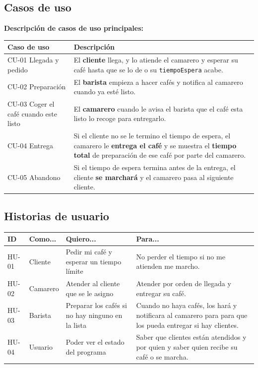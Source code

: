 \documentclass[a4paper,12pt]{report}
\begin{document}
\subsection{Casos de uso}
\noindent \textbf{Descripción de casos de uso principales:}
\begin{table}[H]
  \centering
  \begin{tabularx}{\linewidth}{|l|Y|}
    \hline
    \textbf{Caso de uso} & \textbf{Descripción} \\
    \hline
    CU-01 Llegada y pedido & El \textbf{cliente} llega, y lo atiende el camarero y esperar su café hasta que se lo de o su \texttt{tiempoEspera} acabe. \\
    \hline
    CU-02 Preparación & El \textbf{barista} empieza a hacer cafés y notifica al camarero cuando ya esté listo. \\
    \hline
    CU-03 Coger el café cuando este listo & El \textbf{camarero} cuando le avisa el barista que el café esta listo lo recoge para entregarlo. \\
    \hline
    CU-04 Entrega & Si el cliente no se le termino el tiempo de espera, el camarero le \textbf{entrega el café} y se muestra el \textbf{tiempo total} de preparación de ese café por parte del camarero. \\
    \hline
    CU-05 Abandono & Si el tiempo de espera termina antes de la entrega, el cliente \textbf{se marchará} y el camarero pasa al siguiente cliente. \\
    \hline
  \end{tabularx}
\end{table}

\subsection{Historias de usuario}
\begin{table}[H]
  \centering
  \begin{tabularx}{\linewidth}{|l|Y|Y|Y|}
    \hline
    \textbf{ID} & \textbf{Como...} & \textbf{Quiero...} & \textbf{Para...} \\
    \hline
    HU-01 & Cliente & Pedir mi café y esperar un tiempo límite & No perder el tiempo si no me atienden me marcho. \\
    \hline
    HU-02 & Camarero & Atender al cliente que se le asigno & Atender por orden de llegada y entregar su café. \\
    \hline
    HU-03 & Barista & Preparar los cafés si no hay ninguno en la lista & Cuando no haya cafés, los hará y notificara al camarero para para que los pueda entregar si hay clientes. \\
    \hline
    HU-04 & Usuario & Poder ver el estado del programa & Saber que clientes están atendidos y por quien y saber quien recibe su café o se marcha. \\
    \hline
  \end{tabularx}
\end{table}
\clearpage
\end{document}
